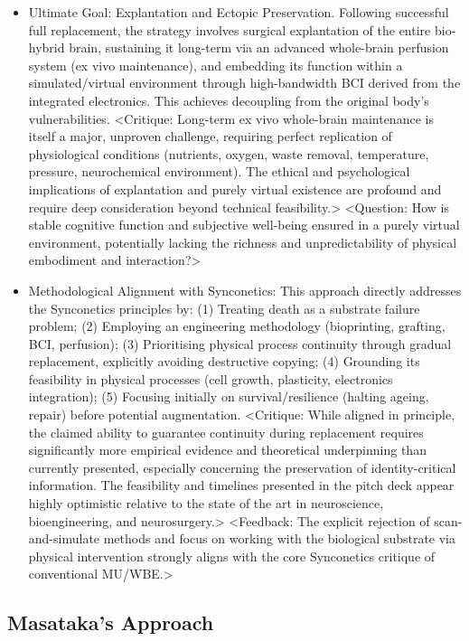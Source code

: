 \documentclass[10pt]{article}
\begin{document}
\begin{sloppypar}
\begin{itemize}
    \item Ultimate Goal: Explantation and Ectopic Preservation. Following successful full replacement, the strategy involves surgical explantation of the entire bio-hybrid brain, sustaining it long-term via an advanced whole-brain perfusion system (ex vivo maintenance), and embedding its function within a simulated/virtual environment through high-bandwidth BCI derived from the integrated electronics. This achieves decoupling from the original body's vulnerabilities. <Critique: Long-term ex vivo whole-brain maintenance is itself a major, unproven challenge, requiring perfect replication of physiological conditions (nutrients, oxygen, waste removal, temperature, pressure, neurochemical environment). The ethical and psychological implications of explantation and purely virtual existence are profound and require deep consideration beyond technical feasibility.> <Question: How is stable cognitive function and subjective well-being ensured in a purely virtual environment, potentially lacking the richness and unpredictability of physical embodiment and interaction?>

    \item Methodological Alignment with Synconetics: This approach directly addresses the Synconetics principles by: (1) Treating death as a substrate failure problem; (2) Employing an engineering methodology (bioprinting, grafting, BCI, perfusion); (3) Prioritising physical process continuity through gradual replacement, explicitly avoiding destructive copying; (4) Grounding its feasibility in physical processes (cell growth, plasticity, electronics integration); (5) Focusing initially on survival/resilience (halting ageing, repair) before potential augmentation. <Critique: While aligned in principle, the claimed ability to guarantee continuity during replacement requires significantly more empirical evidence and theoretical underpinning than currently presented, especially concerning the preservation of identity-critical information. The feasibility and timelines presented in the pitch deck appear highly optimistic relative to the state of the art in neuroscience, bioengineering, and neurosurgery.> <Feedback: The explicit rejection of scan-and-simulate methods and focus on working with the biological substrate via physical intervention strongly aligns with the core Synconetics critique of conventional MU/WBE.>
  \end{itemize}

  \subsection{Masataka's Approach}
  \label{sec:masataka-approach}


\end{sloppypar}
\end{document}
